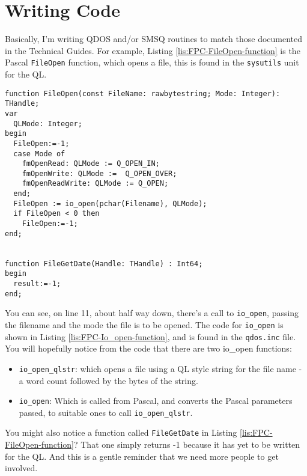 \section{Writing Code}

Basically, I'm writing QDOS and/or SMSQ routines to match those documented
in the Technical Guides. For example, Listing \ref{lis:FPC-FileOpen-function}
is the Pascal \texttt{FileOpen} function, which opens a file, this
is found in the \texttt{sysutils} unit for the QL.

\begin{lstlisting}[caption={FPC FileOpen function},label={lis:FPC-FileOpen-function},language={[Borland6]Pascal},showstringspaces=false,tabsize=4]
function FileOpen(const FileName: rawbytestring; Mode: Integer): THandle;
var
  QLMode: Integer;
begin
  FileOpen:=-1;
  case Mode of
    fmOpenRead: QLMode := Q_OPEN_IN;
    fmOpenWrite: QLMode :=  Q_OPEN_OVER;
    fmOpenReadWrite: QLMode := Q_OPEN;
  end;
  FileOpen := io_open(pchar(Filename), QLMode);
  if FileOpen < 0 then
    FileOpen:=-1;
end;


function FileGetDate(Handle: THandle) : Int64;
begin
  result:=-1;
end;

\end{lstlisting}

You can see, on line 11, about half way down, there's a call to \texttt{io\_open},
passing the filename and the mode the file is to be opened. The code
for \texttt{io\_open} is shown in Listing \ref{lis:FPC-Io_open-function},
and is found in the \texttt{qdos.inc} file. You will hopefully notice
from the code that there are two io\_open functions:
\begin{itemize}
\item \texttt{io\_open\_qlstr}: which opens a file using a QL style string
for the file name - a word count followed by the bytes of the string.
\item \texttt{io\_open}: Which is called from Pascal, and converts the Pascal
parameters passed, to suitable ones to call \texttt{io\_open\_qlstr}.
\end{itemize}
You might also notice a function called \texttt{FileGetDate} in Listing
\ref{lis:FPC-FileOpen-function}? That one simply returns -1 because
it has yet to be written for the QL. And this is a gentle reminder
that we need more people to get involved.

